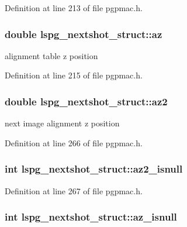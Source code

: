 Definition at line 213 of file pgpmac.h.\hypertarget{structlspg__nextshot__struct_a66e678866ce79f6398b66d033ae45a17}{
\subsubsection[{az}]{\setlength{\rightskip}{0pt plus 5cm}double {\bf lspg\_\-nextshot\_\-struct::az}}}
\label{structlspg__nextshot__struct_a66e678866ce79f6398b66d033ae45a17}


alignment table z position 

Definition at line 215 of file pgpmac.h.\hypertarget{structlspg__nextshot__struct_a94698a030fd5b2abf1f10a2ad33476a4}{
\subsubsection[{az2}]{\setlength{\rightskip}{0pt plus 5cm}double {\bf lspg\_\-nextshot\_\-struct::az2}}}
\label{structlspg__nextshot__struct_a94698a030fd5b2abf1f10a2ad33476a4}


next image alignment z position 

Definition at line 266 of file pgpmac.h.\hypertarget{structlspg__nextshot__struct_a95d080f13a4e02b9aa883821ee3e721c}{
\subsubsection[{az2\_\-isnull}]{\setlength{\rightskip}{0pt plus 5cm}int {\bf lspg\_\-nextshot\_\-struct::az2\_\-isnull}}}
\label{structlspg__nextshot__struct_a95d080f13a4e02b9aa883821ee3e721c}


Definition at line 267 of file pgpmac.h.\hypertarget{structlspg__nextshot__struct_aaebd6d432810313294b5fed5f4445cb1}{
\subsubsection[{az\_\-isnull}]{\setlength{\rightskip}{0pt plus 5cm}int {\bf lspg\_\-nextshot\_\-struct::az\_\-isnull}}}
\label{structlspg__nextshot__struct_aaebd6d432810313294b5fed5f4445cb1}


